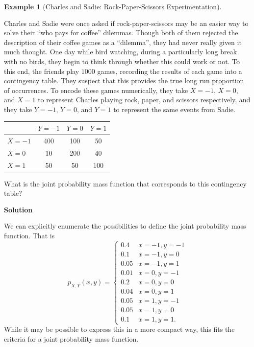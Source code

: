 \documentclass[
  letterpaper,
  DIV=11,
  numbers=noendperiod]{scrreprt}
\theoremstyle{definition}
\theoremstyle{definition}
\newtheorem{example}{Example}[chapter]
\theoremstyle{definition}
\theoremstyle{remark}
\begin{document}
\begin{example}[Charles and Sadie: Rock-Paper-Scissors
Experimentation]\protect\hypertarget{exm-contingency-table-as-joint-pmf}{}\label{exm-contingency-table-as-joint-pmf}

Charles and Sadie were once asked if rock-paper-scissors may be an
easier way to solve their ``who pays for coffee'' dilemmas. Though both
of them rejected the description of their coffee games as a ``dilemma'',
they had never really given it much thought. One day while bird
watching, during a particularly long break with no birds, they begin to
think through whether this could work or not. To this end, the friends
play \(1000\) games, recording the results of each game into a
contingency table. They suspect that this provides the true long run
proportion of occurrences. To encode these games numerically, they take
\(X = -1\), \(X=0\), and \(X=1\) to represent Charles playing rock,
paper, and scissors respectively, and they take \(Y = -1\), \(Y=0\), and
\(Y=1\) to represent the same events from Sadie.

\begin{longtable}[]{@{}lccc@{}}
\toprule\noalign{}
& \(Y=-1\) & \(Y = 0\) & \(Y = 1\) \\
\midrule\noalign{}
\endhead
\bottomrule\noalign{}
\endlastfoot
\(X=-1\) & 400 & 100 & 50 \\
\(X=0\) & 10 & 200 & 40 \\
\(X=1\) & 50 & 50 & 100 \\
\end{longtable}

What is the joint probability mass function that corresponds to this
contingency table?

\begin{tcolorbox}[enhanced jigsaw, colback=white, colframe=quarto-callout-color-frame, arc=.35mm, leftrule=.75mm, rightrule=.15mm, opacityback=0, breakable, bottomrule=.15mm, left=2mm, toprule=.15mm]

\vspace{-3mm}\textbf{Solution}\vspace{3mm}

We can explicitly enumerate the possibilities to define the joint
probability mass function. That is \[p_{X,Y}(x,y) = \begin{cases}
0.4 & x = -1, y = -1 \\
0.1 & x = -1, y = 0 \\
0.05 & x = -1, y = 1 \\
0.01 & x = 0, y = -1 \\
0.2 & x = 0, y = 0 \\
0.04 & x = 0, y = 1 \\
0.05 & x = 1, y = -1 \\
0.05 & x = 1, y = 0 \\
0.1 & x = 1, y = 1.
\end{cases}\] While it may be possible to express this in a more compact
way, this fits the criteria for a joint probability mass function.

\end{tcolorbox}

\end{example}
\end{document}
